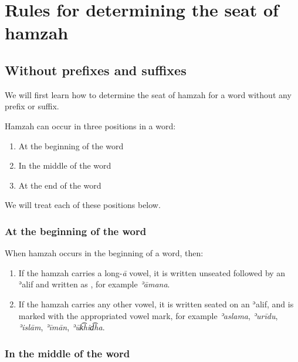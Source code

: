 \documentclass[
  10pt,
]{book}
\providecommand{\tightlist}{%
  \setlength{\itemsep}{0pt}\setlength{\parskip}{0pt}}
\begin{document}
\section{Rules for determining the seat of hamzah}\label{rules-for-determining-the-seat-of-hamzah}

\subsection{Without prefixes and suffixes}\label{without-prefixes-and-suffixes}

We will first learn how to determine the seat of hamzah for a word
without any prefix or suffix.

Hamzah can occur in three positions in a word:

\begin{enumerate}
\def\labelenumi{\arabic{enumi}.}
\tightlist
\item
  At the beginning of the word
\item
  In the middle of the word
\item
  At the end of the word
\end{enumerate}

We will treat each of these positions below.

\subsubsection{At the beginning of the word}\label{at-the-beginning-of-the-word}

When hamzah occurs in the beginning of a word, then:

\begin{enumerate}
\def\labelenumi{\alph{enumi}.}
\tightlist
\item
  If the hamzah carries a long-\emph{ā} vowel, it is written unseated followed by an ʾalif and written as {}, for example {} \emph{ʾāmana}.
\item
  If the hamzah carries any other vowel, it is written seated on an ʾalif, and is marked with the appropriated vowel mark, for example {} \emph{ʾaslama}, {} \emph{ʾurīdu}, {} \emph{ʾislām}, {} \emph{ʾīmān}, {} \emph{ʾūk͡hid͡ha}.
\end{enumerate}

\subsubsection{In the middle of the word}\label{in-the-middle-of-the-word}
\end{document}
